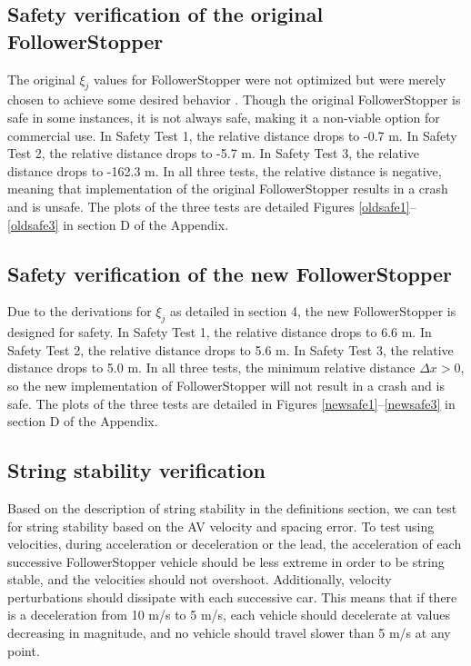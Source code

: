 \documentclass[conference]{IEEEtran}
\begin{document}
\subsection{Safety verification of the original FollowerStopper}
The original $\xi_j$ values for FollowerStopper were not optimized but were merely chosen to achieve some desired behavior \cite{bhadani2019real}. Though the original FollowerStopper is safe in some instances, it is not always safe, making it a non-viable option for commercial use. In Safety Test 1, the relative distance drops to -0.7 m. In Safety Test 2, the relative distance drops to -5.7 m. In Safety Test 3, the relative distance drops to -162.3 m. In all three tests, the relative distance is negative, meaning that implementation of the original FollowerStopper results in a crash and is unsafe. The plots of the three tests are detailed Figures \ref{oldsafe1}--\ref{oldsafe3} in section D of the Appendix.

\subsection{Safety verification of the new FollowerStopper}
Due to the derivations for $\xi_j$ as detailed in section 4, the new FollowerStopper is designed for safety. In Safety Test 1, the relative distance drops to 6.6 m. In Safety Test 2, the relative distance drops to 5.6 m. In Safety Test 3, the relative distance drops to 5.0 m. In all three tests, the minimum relative distance $\Delta x>0$, so the new implementation of FollowerStopper will not result in a crash and is safe. The plots of the three tests are detailed in Figures \ref{newsafe1}--\ref{newsafe3} in section D of the Appendix.

\subsection{String stability verification}
Based on the description of string stability in the definitions section, we can test for string stability based on the AV velocity and spacing error. To test using velocities, during acceleration or deceleration or the lead, the acceleration of each successive FollowerStopper vehicle should be less extreme in order to be string stable, and the velocities should not overshoot. Additionally, velocity perturbations should dissipate with each successive car. This means that if there is a deceleration from 10 m/s to 5 m/s, each vehicle should decelerate at values decreasing in magnitude, and no vehicle should travel slower than 5 m/s at any point. 
\end{document}
